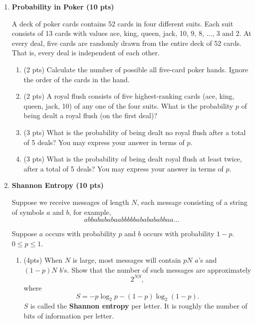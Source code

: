 \documentclass{article}
\theoremstyle{defi}
\begin{document}
\begin{enumerate}
    \item \textbf{Probability in Poker (10 pts)}  
    
    A deck of poker cards contains 52 cards in four different suits. Each suit consists of 13 cards with values ace, king, queen, jack, 10, 9, 8, ..., 3 and 2. At every deal, five cards are randomly drawn from the entire deck of 52 cards. That is, every deal is independent of each other.
    
        \begin{enumerate}
            \item (2 pts) Calculate the number of possible all five-card poker hands. Ignore the order of the cards in the hand.
            \item (2 pts) A royal flush consists of five highest-ranking cards (ace, king, queen, jack, 10) of any one of the four suits. What is the probability $p$ of being dealt a royal flush (on the first deal)?
            \item (3 pts) What is the probability of being dealt no royal flush after a total of 5 deals? You may express your answer in terms of $p$.
            \item (3 pts) What is the probability of being dealt royal flush at least twice, after a total of 5 deals? You may express your answer in terms of $p$.
        \end{enumerate}
    \vspace{15mm}
    
    \item \textbf{Shannon Entropy (10 pts)} 
    
        Suppose we receive messages of length $N$, each message consisting of a string of symbols $a$ and $b$, for example,
        \begin{equation}
            abbabababaabbbbbababababbaa...
        \end{equation}
        
        Suppose  $a$ occurs with probability $p$ and $b$ occurs with probability $1-p$. $0\leq p \leq1$.
        
        \begin{enumerate}
            \item (4pts) When $N$ is large, most messages will contain $pN$ $a$'s and $(1-p)N$ $b$'s. Show that the number of such messages are approximately 
            \begin{equation}
                2^{N S},
            \end{equation}
            where 
            \begin{equation}
                S = -p\log_2{p}-(1-p)\log_2{(1-p)}.
            \end{equation}
            $S$ is called the \textbf{Shannon entropy} per letter. It is roughly the number of bits of information per letter.
            

\end{enumerate}
\end{enumerate}
\end{document}
